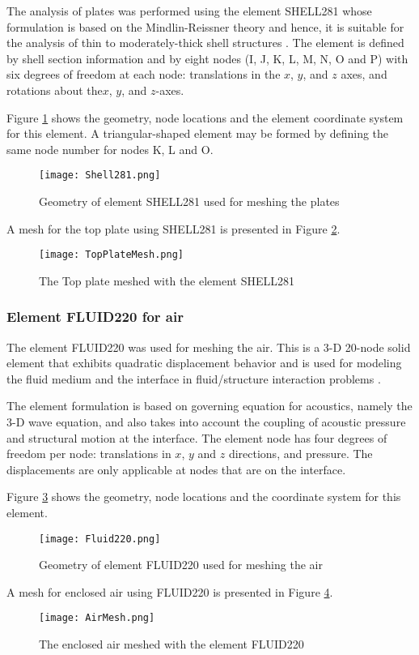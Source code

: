 The analysis of plates was performed using the element SHELL281 whose formulation is based on the Mindlin-Reissner theory and hence, it is suitable for the analysis of thin to moderately-thick shell structures \cite{ANSYS}. The element is defined by shell section information and by eight nodes (I, J, K, L, M, N, O and P) with six degrees of freedom at each node: translations in the $x$, $y$, and $z$ axes, and rotations about the$x$, $y$, and $z$-axes. 

Figure \ref{Shell281} shows the geometry, node locations and the element coordinate system for this element. A triangular-shaped element may be formed by defining the same node number for nodes K, L and O.

\begin{figure}[h]
\centering
\texttt{[image: Shell281.png]}
\caption{Geometry of element SHELL281 used for meshing the plates}
\label{Shell281}
\end{figure}

A mesh for the top plate using SHELL281 is presented in Figure \ref{TopPlateMesh}.

\begin{figure}[h]
\centering
\texttt{[image: TopPlateMesh.png]}
\caption{The Top plate meshed with the element SHELL281}
\label{TopPlateMesh}
\end{figure}

\subsubsection{Element FLUID220 for air}

The element FLUID220 was used for meshing the air. This is a 3-D 20-node solid element that exhibits quadratic displacement behavior and is used for modeling the fluid medium and the interface in fluid/structure interaction problems \cite{ANSYS}. 

The element formulation is based on governing equation for acoustics, namely the 3-D wave equation, and also takes into account the coupling of acoustic pressure and structural motion at the interface. The element node has four degrees of freedom per node: translations in $x$, $y$ and $z$ directions, and pressure. The displacements are only applicable at nodes that are on the interface.

Figure \ref{Fluid220} shows the geometry, node locations and the coordinate system for this element.

\begin{figure}[h]
\centering
\texttt{[image: Fluid220.png]}
\caption{Geometry of element FLUID220 used for meshing the air}
\label{Fluid220}
\end{figure}

A mesh for enclosed air using FLUID220 is presented in Figure \ref{AirMesh}.

\begin{figure}[h]
\centering
\texttt{[image: AirMesh.png]}
\caption{The enclosed air meshed with the element FLUID220}
\label{AirMesh}
\end{figure}
